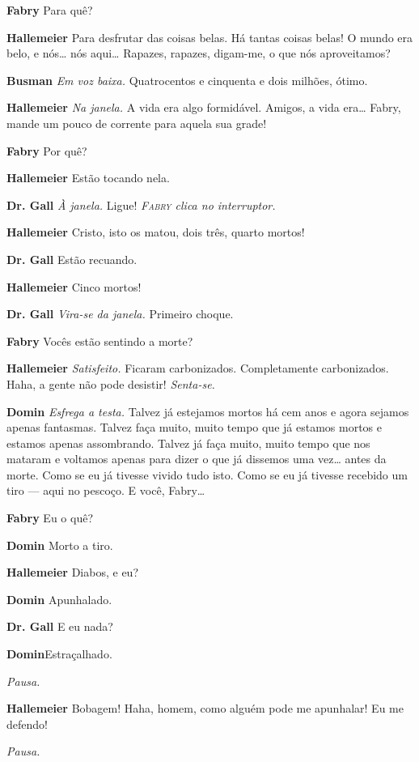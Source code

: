 \textbf{Fabry} Para quê?

\textbf{Hallemeier} Para desfrutar das coisas belas. Há tantas coisas belas! O
mundo era belo, e nós\ldots{} nós aqui\ldots{} Rapazes, rapazes, digam-me, o que nós
aproveitamos?

\textbf{Busman} \emph{Em voz baixa.} Quatrocentos e cinquenta e dois milhões, ótimo.

\textbf{Hallemeier} \emph{Na janela.} A vida era algo formidável. Amigos, a vida era\ldots{}
Fabry, mande um pouco de corrente para aquela sua grade!

\textbf{Fabry} Por quê?

\textbf{Hallemeier} Estão tocando nela.

\textbf{Dr. Gall} \emph{À janela.} Ligue!
\emph{\textsc{Fabry} clica no interruptor.}

\textbf{Hallemeier} Cristo, isto os matou, dois três, quarto mortos!

\textbf{Dr. Gall} Estão recuando.

\textbf{Hallemeier} Cinco mortos!

\textbf{Dr. Gall} \emph{Vira-se da janela.} Primeiro choque.

\textbf{Fabry} Vocês estão sentindo a morte?

\textbf{Hallemeier} \emph{Satisfeito.} Ficaram carbonizados. Completamente
carbonizados. Haha, a gente não pode desistir! \emph{Senta-se.}

\textbf{Domin} \emph{Esfrega a testa.} Talvez já estejamos mortos há cem anos e agora
sejamos apenas fantasmas. Talvez faça muito, muito tempo que já estamos mortos e
 estamos apenas assombrando. Talvez já faça muito, muito tempo que nos mataram e
voltamos apenas para dizer o que já dissemos uma vez\ldots{} antes da morte.
Como se eu já tivesse vivido tudo isto. Como se eu já tivesse recebido um tiro
--- aqui no pescoço. E você, Fabry\ldots{}

\textbf{Fabry} Eu o quê?

\textbf{Domin} Morto a tiro.

\textbf{Hallemeier} Diabos, e eu?

\textbf{Domin} Apunhalado.

\textbf{Dr. Gall} E eu nada?

\textbf{Domin}Estraçalhado.

\emph{Pausa.}

\textbf{Hallemeier} Bobagem! Haha, homem, como alguém pode me apunhalar! Eu me defendo!

\emph{Pausa.}

